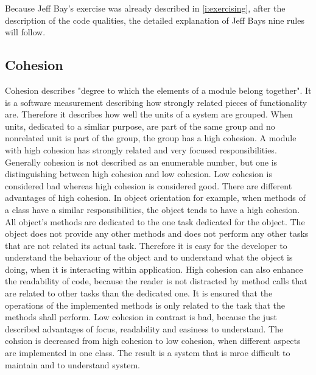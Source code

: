 Because Jeff Bay's exercise was already described in \ref{i:exercising}, after the description of the code qualities, the detailed explanation of Jeff Bays nine rules will follow. 

\subsection{Cohesion}
Cohesion describes "degree to which the elements of a module belong together"\cite{cohesionBook}. It is a software measurement describing how strongly related pieces of functionality are. Therefore it describes how well the units of a system are grouped. When units, dedicated to a simliar purpose, are part of the same group and no nonrelated unit is part of the group, the group has a high cohesion. A module with high cohesion has strongly related and very focused responsibilities\cite{wiki:cohesion}. Generally cohesion is not described as an enumerable number, but one is distinguishing between high cohesion and low cohesion. Low cohesion is considered bad whereas high cohesion is considered good.
There are different advantages of high cohesion. In object orientation for example, when methods of a class have a similar responsibilities, the object tends to have a high cohesion. All object's methods are dedicated to the one task dedicated for the object. The object does not provide any other methods and does not perform any other tasks that are not related its actual task. Therefore it is easy for the developer to understand the behaviour of the object and to understand what the object is doing, when it is interacting within application. High cohesion can also enhance the readability of code, because the reader is not distracted by method calls that are related to other tasks than the dedicated one. It is ensured that the operations of the implemented methods is only related to the task that the methods shall perform. 
Low cohesion in contrast is bad, because the just described advantages of focus, readability and easiness to understand. The cohsion is decreased from high cohesion to low cohesion, when different aspects are implemented in one class. The result is a system that is mroe difficult to maintain and to understand system. 

